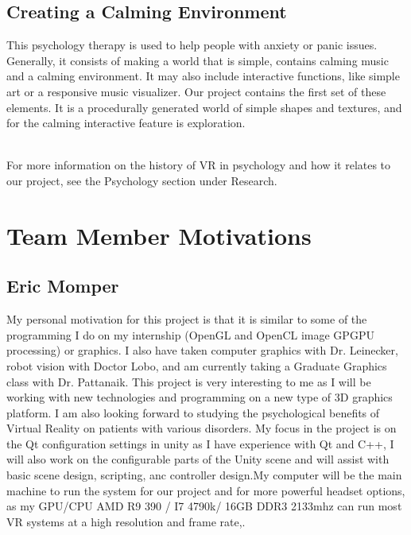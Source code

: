\documentclass[a4paper,10pt]{article}
\begin{document}
	\subsection{Creating a Calming Environment}
	This psychology therapy is used to help people with anxiety or panic issues.  Generally, it consists of making a world that is simple, contains calming music and a calming environment. It may also include interactive functions, like simple art or a responsive music visualizer.  Our project contains the first set of these elements. It is a procedurally generated world of simple shapes and textures, and for the calming interactive feature is exploration.
	\par~\\ 
	For more information on the history of VR in psychology and how it relates to our project, see the Psychology section under Research.
	\pagebreak
	
	
	\section{Team Member Motivations}
	\subsection{Eric Momper}
	My personal motivation for this project is that it is similar to some of the programming I do on my internship (OpenGL and OpenCL image GPGPU processing) or graphics. I also have taken computer graphics with Dr. Leinecker, robot vision with Doctor Lobo, and am currently taking a Graduate Graphics class with Dr. Pattanaik. This project is very interesting to me as I will be working with new technologies and programming on a new type of 3D graphics platform. I am also looking forward to studying the psychological benefits of Virtual Reality on patients with various disorders. My focus in the project is on the Qt configuration settings in unity as I have experience with Qt and C++, I will also work on the configurable parts of the Unity scene and will assist with basic scene design, scripting, anc controller design.My computer will be the main machine to run the system for our project and for more powerful headset options, as my GPU/CPU AMD R9 390 / I7 4790k/ 16GB DDR3 2133mhz can run most VR systems at a high resolution and frame rate,.
	
\end{document}
